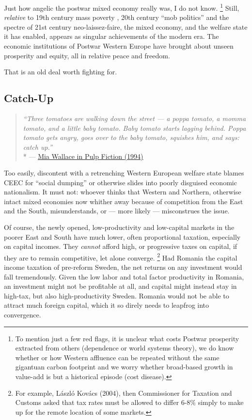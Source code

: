 Just how angelic the postwar mixed economy really was, I do not know.
\footnote{
	To mention just a few red flags, it is unclear what costs Postwar prosperity extracted from others (dependence or world systems theory), we do know whether or how Western affluence can be repeated without the same gigantuan carbon footprint and we worry whether broad-based growth in value-add is but a historical episode (cost disease).
}
Still, \emph{relative} to 19th century mass poverty \citep{MarxEngels-1848-aa}, 20th century ``mob politics'' \citep[158]{Crouch2004} and the spectre of 21st century neo-laissez-faire, the mixed economy, and the welfare state it has enabled, appears as singular achievements of the modern era.
The economic institutions of Postwar Western Europe have brought about unseen prosperity and equity, all in relative peace and freedom.

That is an old deal worth fighting for.

\subsection{Catch-Up}
\begin{quote}
	\emph{``Three tomatoes are walking down the street --- a poppa tomato, a momma tomato, and a little baby tomato.
	Baby tomato starts lagging behind.
	Poppa tomato gets angry, goes over to the baby tomato, squishes him, and says:
	catch up.''}
	\\*
	--- \href{http://www.youtube.com/watch?v=5D-QKY0-Bxk}{Mia Wallace in Pulp Fiction (1994)}
\end{quote}

Too easily, discontent with a retrenching Western European welfare state blames \gls{CEEC} for ``social dumping'' %
or otherwise slides into poorly disguised economic nationalism.
It must not:
whoever thinks that Western and Northern, otherwise intact mixed economies now whither away because of competition from the East and the South, misunderstands, or --- more likely --- misconstrues the issue.

Of course, the newly opened, low-productivity and low-capital markets in the poorer East and South have much lower, often proportional taxation, especially on capital incomes.
They \emph{cannot} afford high, or progressive taxes on capital, if they are to remain competitive, let alone converge.
\footnote{
	For example, L\'{a}szl\'{o} Kov\'{a}cs (2004), then Commissioner for Taxation and Customs asked that tax rates must be allowed to differ 6-8\% simply to make up for the remote location of some markets.
}
Had Romania the capital income taxation of pre-reform Sweden, the net returns on any investment would fall tremendously.
Given the low labor and total factor productivity in Romania, an investment might not be profitable at all, and capital might instead stay in high-tax, but also high-productivity Sweden.
Romania would not be able to attract much foreign capital, which it so direly needs to leapfrog into convergence.

